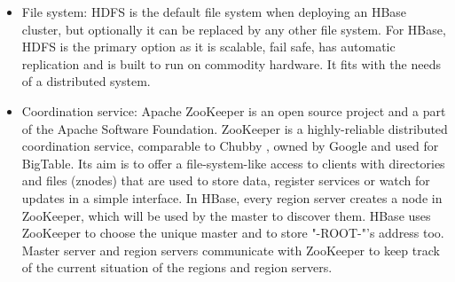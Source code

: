 \begin{itemize}
\item File system: HDFS \cite{ApacheHadoop, HDFSarchitecture} is the default file system when deploying an HBase cluster, but optionally it can be replaced by any other file system. For HBase, HDFS is the primary option as it is scalable, fail safe, has automatic replication and is built to run on commodity hardware. It fits with the needs of a distributed system. 


\item Coordination service: Apache ZooKeeper \cite{ApacheZooKeeper, hunt2010zookeeper, junqueira2011zab} is an open source project and a part of the Apache Software Foundation. ZooKeeper is a highly-reliable distributed coordination service, comparable to Chubby \cite{burrows2006chubby}, owned by Google and used for BigTable. Its aim is to offer a file-system-like access to clients with directories and files (znodes) that are used to store data, register services or watch for updates in a simple interface. In HBase, every region server creates a node in ZooKeeper, which will be used by the master to discover them. HBase uses ZooKeeper to choose the unique master and to store "-ROOT-"'s address too.
Master server and region servers communicate with ZooKeeper to keep track of the current situation of the regions and region servers.
\end{itemize}
